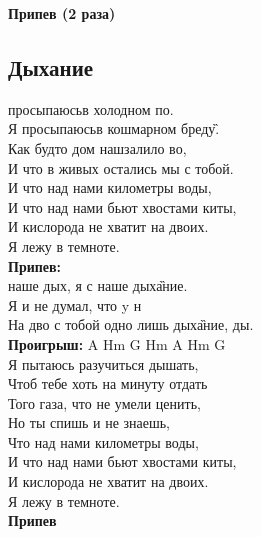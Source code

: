\documentclass[fleqn,a5paper,12pt,twoside]{guitartabs}
\newcommand{\musSharp}{\texttt{\#}}
\begin{document}
    \-\hspace{10mm}\textbf{Припев (2 раза)}
\newpage
{}%
\subsection*{Дыхание}
     просыпаюсь\A{ }в  холодном по.\\
    Я просыпаюсь\CHORD{F\musSharp}{ }в кошмарном бред\G{у}.\\
    Как будто дом наш\D{ }залило во,\\
    И что в живых остались  мы с тобой.\\
    И что над нами километры воды,\\
    И что над нами бьют хвостами киты,\\
    И кислорода не хватит на двоих.\\
    Я лежу в темноте.\\

    \-\hspace{10mm}\textbf{Припев:}\\
    \-\hspace{10mm} наше дых, я с наше дых\G{ание}.\\
    \-\hspace{10mm}Я  и не думал, что y н\\
    \-\hspace{10mm}На дво с тобой одно лишь дых\G{ание}, ды.\\

     \-\hspace{10mm}\textbf{Проигрыш:} A Hm G Hm A Hm G \\
    
    Я пытаюсь разучиться дышать,\\
    Чтоб тебе хоть на минуту отдать\\
    Того газа, что не умели ценить,\\
    Но ты спишь и не знаешь,\\
    Что над нами километры воды,\\
    И что над нами бьют хвостами киты,\\
    И кислорода не хватит на двоих.\\
    Я лежу в темноте.\\
    
    \-\hspace{10mm}\textbf{Припев}    
\newpage
{}%
\end{document}
